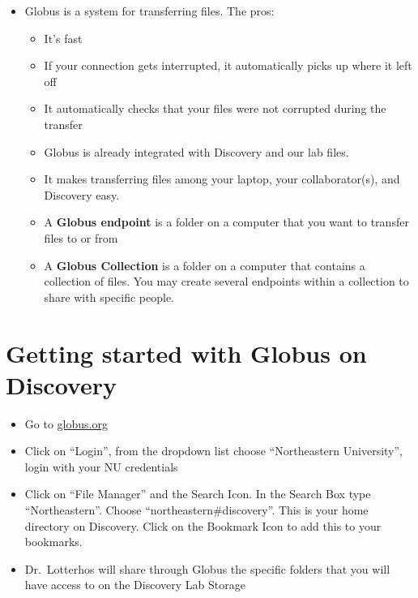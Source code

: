 \documentclass[
  letterpaper,
  DIV=11,
  numbers=noendperiod]{scrreprt}
\begin{document}
\begin{itemize}
\item
  Globus is a system for transferring files. The pros:

  \begin{itemize}
  \item
    It's fast
  \item
    If your connection gets interrupted, it automatically picks up where
    it left off
  \item
    It automatically checks that your files were not corrupted during
    the transfer
  \item
    Globus is already integrated with Discovery and our lab files.
  \item
    It makes transferring files among your laptop, your collaborator(s),
    and Discovery easy.
  \item
    A \textbf{Globus endpoint} is a folder on a computer that you want
    to transfer files to or from
  \item
    A \textbf{Globus Collection} is a folder on a computer that contains
    a collection of files. You may create several endpoints within a
    collection to share with specific people.
  \end{itemize}
\end{itemize}

\hypertarget{getting-started-with-globus-on-discovery}{%
\section*{\texorpdfstring{\textbf{Getting started with Globus on
Discovery}}{Getting started with Globus on Discovery}}\label{getting-started-with-globus-on-discovery}}

\begin{itemize}
\item
  Go to
  \href{https://drk-lo.github.io/lotterhoslabprotocols/discovery_2-globus/globus.org}{globus.org}
\item
  Click on ``Login'', from the dropdown list choose ``Northeastern
  University'', login with your NU credentials
\item
  Click on ``File Manager'' and the Search Icon. In the Search Box type
  ``Northeastern''. Choose ``northeastern\#discovery''. This is your
  home directory on Discovery. Click on the Bookmark Icon to add this to
  your bookmarks.
\item
  Dr.~Lotterhos will share through Globus the specific folders that you
  will have access to on the Discovery Lab Storage
\end{itemize}
\end{document}
